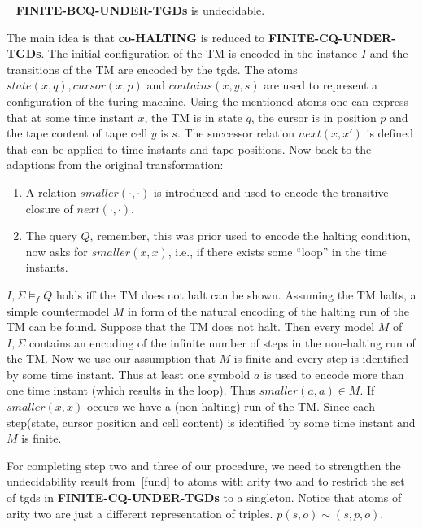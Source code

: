 \begin{theorem}\label{fund}~\cite{pichler2014containment}
	\textbf{FINITE-BCQ-UNDER-TGDs} is undecidable.
\end{theorem}
\begin{proofidea}
	The main idea is that \textbf{co-HALTING} is reduced to
	\textbf{FINITE-CQ-UNDER-TGDs}. 
	The initial configuration of the TM is encoded in the instance $I$ and the
	transitions of the TM are encoded by the tgds. 
	The atoms $state(x,q), cursor(x,p)$ and $contains(x,y,s)$ are used to
	represent a configuration of the turing machine. Using the mentioned atoms one can
	express that at some time instant $x$, the TM is in state $q$, the cursor is
	in position $p$ and the tape content of tape cell $y$ is $s$.
	The successor relation $next(x,x')$ is defined that can be applied to time
	instants and tape positions.
	Now back to the adaptions from the original transformation:
	\begin{enumerate}
		\item A relation $smaller(\cdot,\cdot)$ is introduced and
		used to encode the transitive closure of $next(\cdot,\cdot)$.
	\item The query $Q$, remember, this was prior used to encode the halting
			condition, now asks for $smaller(x,x)$, i.e., if there exists some
		``loop'' in the time instants.  
	\end{enumerate}
	$I,\Sigma \models_f Q$ holds iff the TM does not halt can be shown.
	Assuming the TM halts, a simple countermodel $M$ in form of the natural encoding
	of the halting run of the TM can be found.
	Suppose that the TM does not halt. Then every model $M$ of $I,\Sigma$
	contains an encoding of the infinite number of steps in the non-halting run
	of the TM. Now we use our assumption that $M$ is finite and every step is
	identified by some time instant. Thus at least one symbold $a$ is used to
	encode more than one time instant (which results in the loop). Thus
	$smaller(a,a) \in M$. If $smaller(x,x)$ occurs we have a (non-halting) run of the TM. 
	Since each step(state, cursor position and cell content) is identified by
	some time instant and $M$ is finite. 
\end{proofidea}

For completing step two and three of our procedure, we need to strengthen the
undecidability result from~\ref{fund} to atoms with arity two and to restrict
the set of tgds in \textbf{FINITE-CQ-UNDER-TGDs} to a singleton. 
Notice that atoms of arity two are just a different representation of triples. 
$p(s,o) \sim (s,p,o)$.

